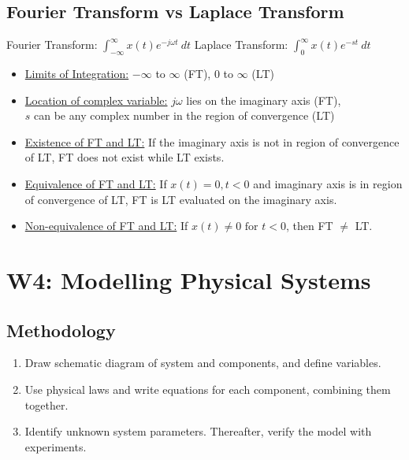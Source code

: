 \documentclass[a4paper]{article}
\begin{document}
\subsection{Fourier Transform vs Laplace Transform}
\begin{center}
    Fourier Transform: $\displaystyle \int_{-\infty}^{\infty}x(t)e^{-j\omega t}\ dt$\hspace{1cm} Laplace Transform: $\displaystyle \int_0^\infty x(t)e^{-st}\ dt$
\end{center}
\begin{itemize}
    \item \underline{Limits of Integration:} $-\infty$ to $\infty$ (FT), 0 to $\infty$ (LT)
    \item \underline{Location of complex variable:} $j\omega$ lies on the imaginary axis (FT), \\$s$ can be any complex number in the region of convergence (LT)
    \item \underline{Existence of FT and LT:} If the imaginary axis is not in region of convergence of LT, FT does not exist while LT exists.
    \item \underline{Equivalence of FT and LT:} If $x(t) = 0, t<0$ and imaginary axis is in region of convergence of LT, FT is LT evaluated on the imaginary axis.
    \item \underline{Non-equivalence of FT and LT:} If $x(t) \neq 0 \text{ for } t<0$, then FT $\neq$ LT.
\end{itemize}

\newpage
\section{W4: Modelling Physical Systems}
\subsection{Methodology}
\begin{enumerate}
    \item Draw schematic diagram of system and components, and define variables.
    \item Use physical laws and write equations for each component, combining them together.
    \item Identify unknown system parameters. Thereafter, verify the model with experiments.
\end{enumerate}
\end{document}
